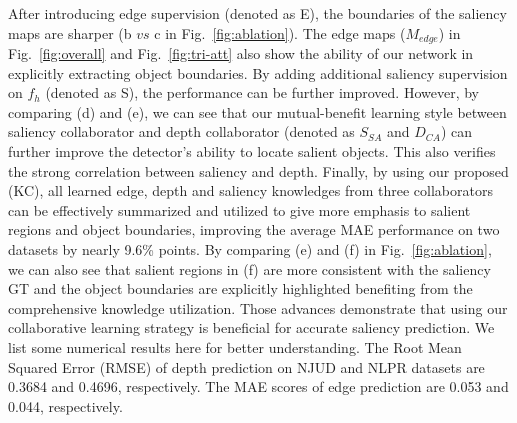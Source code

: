 \documentclass[runningheads]{llncs}
\begin{document}
After introducing edge supervision (denoted as E), the boundaries of the saliency maps are sharper (b $vs$ c in Fig.~\ref{fig:ablation}).
The edge maps ($M_{edge}$) in Fig.~\ref{fig:overall} and Fig.~\ref{fig:tri-att} also show the ability of our network in explicitly extracting object boundaries.
By adding additional saliency supervision on $f_h$ (denoted as S), the performance can be further improved.
However, by comparing (d) and (e), we can see that our mutual-benefit learning style between saliency collaborator and depth collaborator (denoted as $S_{SA}$ and $D_{CA}$) can further improve the detector's ability to locate salient objects.
This also verifies the strong correlation between saliency and depth.
Finally, by using our proposed (KC), all learned edge, depth and saliency knowledges from three collaborators can be effectively summarized and utilized to give more emphasis to salient regions and object boundaries, improving the average MAE performance on two datasets by nearly 9.6\% points.
By comparing (e) and (f) in Fig.~\ref{fig:ablation}, we can also see that salient regions in (f) are more consistent with the saliency GT and the object boundaries are explicitly highlighted benefiting from the comprehensive knowledge utilization.
Those advances demonstrate that using our collaborative learning strategy is beneficial for accurate saliency prediction.
We list some numerical results here for better understanding. The Root Mean Squared Error (RMSE) of depth prediction on NJUD and NLPR datasets are 0.3684 and 0.4696, respectively.
The MAE scores of edge prediction are 0.053 and 0.044, respectively.
\end{document}
